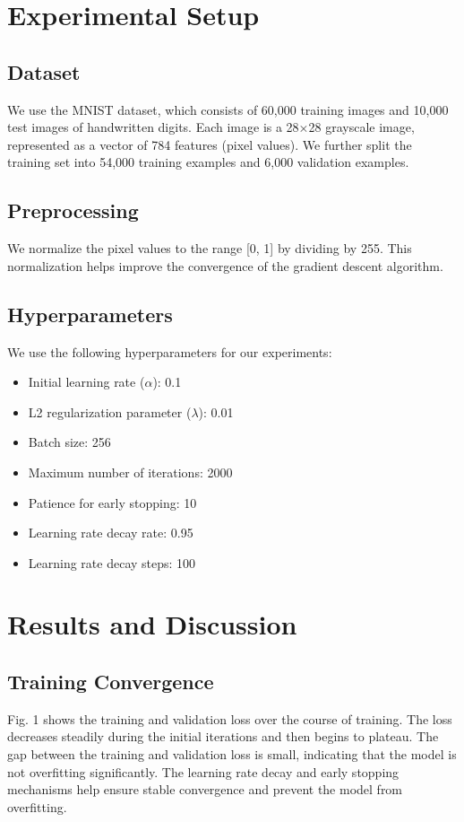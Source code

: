 \documentclass[10pt,journal,compsoc]{IEEEtran}
\begin{document}
\section{Experimental Setup}
\subsection{Dataset}
We use the MNIST dataset, which consists of 60,000 training images and 10,000 test images of handwritten digits. Each image is a 28×28 grayscale image, represented as a vector of 784 features (pixel values). We further split the training set into 54,000 training examples and 6,000 validation examples.

\subsection{Preprocessing}
We normalize the pixel values to the range [0, 1] by dividing by 255. This normalization helps improve the convergence of the gradient descent algorithm.

\subsection{Hyperparameters}
We use the following hyperparameters for our experiments:
\begin{itemize}
    \item Initial learning rate ($\alpha$): 0.1
    \item L2 regularization parameter ($\lambda$): 0.01
    \item Batch size: 256
    \item Maximum number of iterations: 2000
    \item Patience for early stopping: 10
    \item Learning rate decay rate: 0.95
    \item Learning rate decay steps: 100
\end{itemize}

\section{Results and Discussion}
\subsection{Training Convergence}
Fig. 1 shows the training and validation loss over the course of training. The loss decreases steadily during the initial iterations and then begins to plateau. The gap between the training and validation loss is small, indicating that the model is not overfitting significantly. The learning rate decay and early stopping mechanisms help ensure stable convergence and prevent the model from overfitting.
\end{document}
